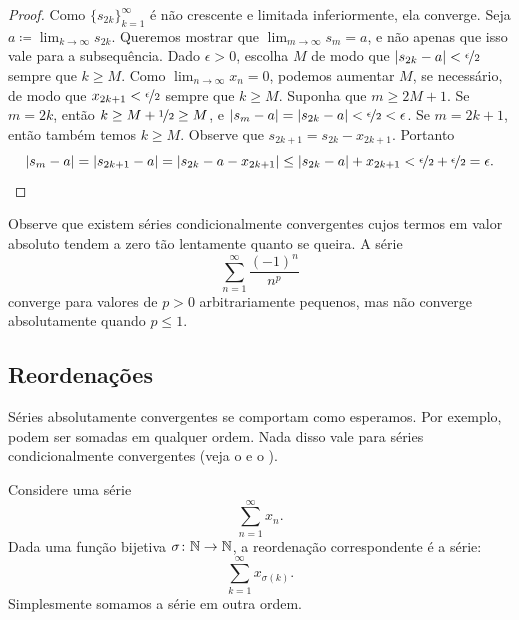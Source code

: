 \begin{proof}
Como $\{ s_{2k} \}_{k=1}^\infty$ é não crescente e limitada inferiormente, ela converge.
Seja $a \coloneqq \lim_{k\to\infty} s_{2k}$.
Queremos mostrar que $\lim_{m\to\infty} s_m = a$, e não apenas que isso vale para a subsequência.
Dado $\epsilon > 0$, escolha $M$ de modo que $\lvert {s_{2k}-a} \rvert <
\nicefrac{\epsilon}{2}$ sempre que $k \geq M$.
Como $\lim_{n\to\infty} x_n = 0$, podemos aumentar $M$, se necessário,
de modo que
$x_{2k+1} < \nicefrac{\epsilon}{2}$ sempre que $k \geq M$.  
Suponha que $m \geq 2M+1$. Se $m=2k$, então $k \geq M+\nicefrac{1}{2} \geq M$, e
$\lvert {s_{m}-a} \rvert=\lvert {s_{2k}-a} \rvert < \nicefrac{\epsilon}{2} < \epsilon$.
Se $m=2k+1$, então também temos $k \geq M$. Observe que
$s_{2k+1} = s_{2k} - x_{2k+1}$.
Portanto
\begin{equation*}
\lvert {s_{m}-a} \rvert = 
\lvert {s_{2k+1}-a} \rvert = 
\lvert {s_{2k}-a - x_{2k+1}} \rvert \leq
\lvert {s_{2k}-a} \rvert + x_{2k+1} < 
\nicefrac{\epsilon}{2}+ \nicefrac{\epsilon}{2} = \epsilon .  \qedhere
\end{equation*}
\end{proof}

Observe que existem séries condicionalmente convergentes cujos termos em valor absoluto
tendem a zero tão lentamente quanto se queira.
A série
\begin{equation*}
\sum_{n=1}^\infty \frac{{(-1)}^n}{n^p}
\end{equation*}
converge para valores de $p > 0$ arbitrariamente pequenos, mas não converge
absolutamente quando $p \leq 1$.

\subsection{Reordenações}

Séries absolutamente convergentes se comportam como esperamos. Por exemplo,
podem ser somadas em qualquer ordem. Nada disso vale para séries
condicionalmente convergentes (veja o 
e o ).

Considere uma série
\begin{equation*}
\sum_{n=1}^\infty x_n .
\end{equation*}
Dada uma função bijetiva $\sigma \colon {\mathbb{N}} \to {\mathbb{N}}$, a reordenação
correspondente é a série:
\begin{equation*}
\sum_{k=1}^\infty x_{\sigma(k)} .
\end{equation*}
Simplesmente somamos a série em outra ordem.

